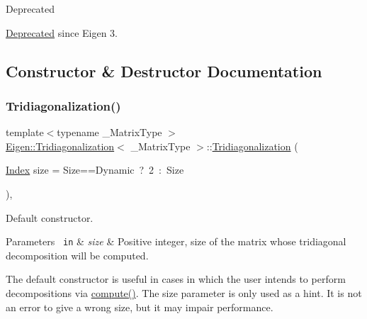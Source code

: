 \begin{DoxyRefDesc}{Deprecated}
\item[\mbox{\hyperlink{deprecated__deprecated000024}{Deprecated}}]since Eigen 3. \end{DoxyRefDesc}


\subsection{Constructor \& Destructor Documentation}
\mbox{\label{class_eigen_1_1_tridiagonalization_a9ea2e6154bf35494ee68e037f0867cbd}} 
\subsubsection{\texorpdfstring{Tridiagonalization()}{Tridiagonalization()}\hspace{0.1cm}{\footnotesize\ttfamily [1/2]}}
{\footnotesize\ttfamily template$<$typename \+\_\+\+Matrix\+Type $>$ \\
\mbox{\hyperlink{class_eigen_1_1_tridiagonalization}{Eigen\+::\+Tridiagonalization}}$<$ \+\_\+\+Matrix\+Type $>$\+::\mbox{\hyperlink{class_eigen_1_1_tridiagonalization}{Tridiagonalization}} (\begin{DoxyParamCaption}\item[{\mbox{\hyperlink{class_eigen_1_1_tridiagonalization_a7bd1f9fccec1e93b77a2214b2d30aae9}{Index}}}]{size = {\ttfamily Size==Dynamic~?~2~\+:~Size} }\end{DoxyParamCaption})\hspace{0.3cm}{\ttfamily [inline]}, {\ttfamily [explicit]}}



Default constructor. 


\begin{DoxyParams}[1]{Parameters}
\mbox{\texttt{ in}}  & {\em size} & Positive integer, size of the matrix whose tridiagonal decomposition will be computed.\\
\hline
\end{DoxyParams}
The default constructor is useful in cases in which the user intends to perform decompositions via \mbox{\hyperlink{class_eigen_1_1_tridiagonalization_acd288abb081d3b40b87e4b98cd8f6ee9}{compute()}}. The {\ttfamily size} parameter is only used as a hint. It is not an error to give a wrong {\ttfamily size}, but it may impair performance.

